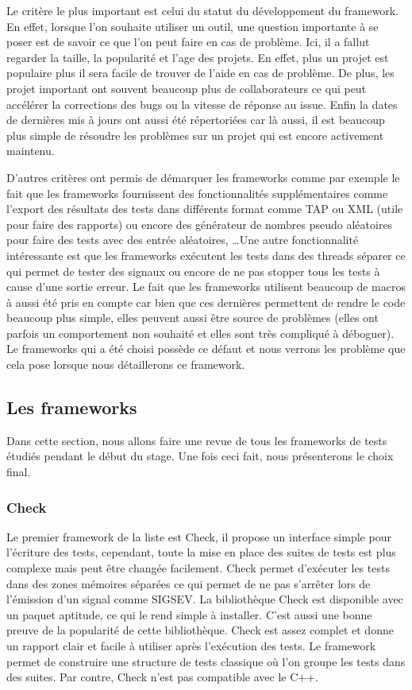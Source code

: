 \documentclass[a4paper]{article}
\begin{document}
Le critère le plus important est celui du statut du développement du framework.
En effet, lorsque l'on souhaite utiliser un outil, une question importante à se
poser est de savoir ce que l'on peut faire en cas de problème. Ici, il a fallut
regarder la taille, la popularité et l'age des projets. En effet, plus un projet
est populaire plus il sera facile de trouver de l'aide en cas de problème. De
plus, les projet important ont souvent beaucoup plus de collaborateurs ce qui
peut accélérer la corrections des bugs ou la vitesse de réponse au issue. Enfin
la dates de dernières mis à jours ont aussi été répertoriées car là aussi, il
est beaucoup plus simple de résoudre les problèmes sur un projet qui est encore
activement maintenu.

D'autres critères ont permis de démarquer les frameworks comme par exemple le
fait que les frameworks fournissent des fonctionnalités supplémentaires comme
l'export des résultats des tests dans différents format comme TAP ou XML (utile
pour faire des rapports) ou encore des générateur de nombres pseudo aléatoires
pour faire des tests avec des entrée aléatoires, \dots Une autre fonctionnalité
intéressante est que les frameworks exécutent les tests dans des threads séparer
ce qui permet de tester des signaux ou encore de ne pas stopper tous les tests à
cause d'une sortie erreur. Le fait que les frameworks utilisent beaucoup de
macros à aussi été pris en compte car bien que ces dernières permettent de
rendre le code beaucoup plus simple, elles peuvent aussi être source de
problèmes (elles ont parfois un comportement non souhaité et elles sont très
compliqué à déboguer). Le frameworks qui a été choisi possède ce défaut et nous
verrons les problème que cela pose lorsque nous détaillerons ce framework.
\subsection{Les frameworks}%

Dans cette section, nous allons faire une revue de tous les frameworks de tests
étudiés pendant le début du stage. Une fois ceci fait, nous présenterons le
choix final.

\subsubsection*{Check}

Le premier framework de la liste est Check, il propose un interface simple pour
l'écriture des tests, cependant, toute la mise en place des suites de tests est
plus complexe mais peut être changée facilement. Check permet d'exécuter les
tests dans des zones mémoires séparées ce qui permet de ne pas s'arrêter lors de
l'émission d'un signal comme SIGSEV. La bibliothèque Check est disponible avec
un paquet aptitude, ce qui le rend simple à installer. C'est aussi une bonne
preuve de la popularité de cette bibliothèque. Check est assez complet et donne
un rapport clair et facile à utiliser après l'exécution des tests. Le framework
permet de construire une structure de tests classique où l'on groupe les tests
dans des suites. Par contre, Check n'est pas compatible avec le C++.
\end{document}
